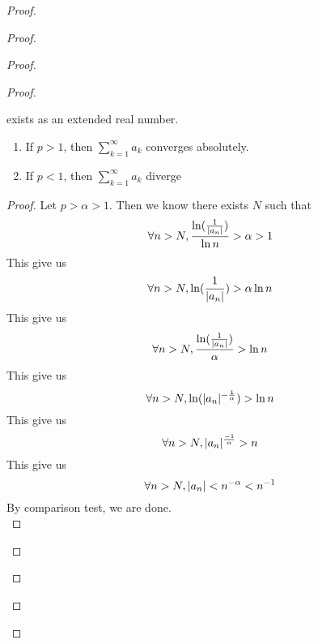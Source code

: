 \documentclass{report}
\begin{document}
\begin{proof}
\begin{proof}
\begin{proof}
\begin{proof}
\begin{question}{}{}
\begin{enumerate}
\[    \]
    exists as an extended real number.
    \begin{enumerate}
        \item If \( p > 1 \), then \(\sum_{k=1}^{\infty} a_k\) converges absolutely.
        \item If \( p < 1 \), then $\sum _{k=1}^\infty a_k$ diverge
    \end{enumerate}
\end{enumerate}
\end{question}
\begin{proof}
Let $p>\alpha >1$.  Then we know there exists $N$ such that
 \begin{equation}
\forall n>N, \frac{\ln (\frac{1}{|a_n|})}{\ln n}>\alpha >1
\end{equation}
This give us
\begin{equation}
\forall n>N, \ln(\frac{1}{|a_n|})>\alpha \ln n 
\end{equation}
This give us
\begin{equation}
\forall n>N, \frac{\ln (\frac{1}{|a_n|})}{\alpha }>\ln n
\end{equation}
This give us
\begin{equation}
\forall n>N, \ln (|a_n|^{-\frac{1}{\alpha }})>\ln n
\end{equation}
This give us
\begin{equation}
\forall n>N, |a_n|^{\frac{-1}{\alpha }}>n
\end{equation}
This give us
\begin{equation}
\forall n>N, |a_n|<n^{-\alpha }<n^{-1}
\end{equation}
By comparison test, we are done.\\


\end{proof}
\end{proof}
\end{proof}
\end{proof}
\end{proof}
\end{document}
